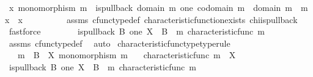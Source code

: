 \begin{isabellebody}
\ {\isachardoublequoteopen}{\isasymAnd}x{\isachardot}{\kern0pt}\ monomorphism\ m\ {\isasymlongrightarrow}\ is{\isacharunderscore}{\kern0pt}pullback\ {\isacharparenleft}{\kern0pt}domain\ m{\isacharparenright}{\kern0pt}\ one\ {\isacharparenleft}{\kern0pt}codomain\ m{\isacharparenright}{\kern0pt}\ {\isasymOmega}\ {\isacharparenleft}{\kern0pt}{\isasymbeta}\isactrlbsub domain\ m\isactrlesub {\isacharparenright}{\kern0pt}\ {\isasymt}\ m\ x\ {\isasymLongrightarrow}\ x\ {\isacharequal}{\kern0pt}\ {\isasymchi}{\isachardoublequoteclose}\isanewline
\ \ \ \ \ \ \isamarkupfalse%
\ assms\ cfunc{\isacharunderscore}{\kern0pt}type{\isacharunderscore}{\kern0pt}def\ characteristic{\isacharunderscore}{\kern0pt}function{\isacharunderscore}{\kern0pt}exists\ chi{\isacharunderscore}{\kern0pt}is{\isacharunderscore}{\kern0pt}pullback\ \isamarkupfalse%
\ fastforce\isanewline
\ \ \isamarkupfalse%
\isanewline
\ \ \isamarkupfalse%
\ \isamarkupfalse%
\ {\isachardoublequoteopen}is{\isacharunderscore}{\kern0pt}pullback\ B\ one\ X\ {\isasymOmega}\ {\isacharparenleft}{\kern0pt}{\isasymbeta}\isactrlbsub B\isactrlesub {\isacharparenright}{\kern0pt}\ {\isasymt}\ m\ {\isacharparenleft}{\kern0pt}characteristic{\isacharunderscore}{\kern0pt}func\ m{\isacharparenright}{\kern0pt}{\isachardoublequoteclose}\isanewline
\ \ \ \ \isamarkupfalse%
\ assms\ cfunc{\isacharunderscore}{\kern0pt}type{\isacharunderscore}{\kern0pt}def\ \isamarkupfalse%
\ auto\isanewline
{}\isamarkupfalse%
%
\endisatagproof
{\isafoldproof}%
%
\isadelimproof
\isanewline
%
\endisadelimproof
\isanewline
{}\isamarkupfalse%
\ characteristic{\isacharunderscore}{\kern0pt}func{\isacharunderscore}{\kern0pt}type{\isacharbrackleft}{\kern0pt}type{\isacharunderscore}{\kern0pt}rule{\isacharbrackright}{\kern0pt}{\isacharcolon}{\kern0pt}\isanewline
\ \ \ {\isachardoublequoteopen}m\ {\isacharcolon}{\kern0pt}\ B\ {\isasymrightarrow}\ X{\isachardoublequoteclose}\ {\isachardoublequoteopen}monomorphism\ m{\isachardoublequoteclose}\isanewline
\ \ \ {\isachardoublequoteopen}characteristic{\isacharunderscore}{\kern0pt}func\ m\ {\isacharcolon}{\kern0pt}\ X\ {\isasymrightarrow}\ {\isasymOmega}{\isachardoublequoteclose}\isanewline
%
\isadelimproof
%
\endisadelimproof
%
\isatagproof
{}\isamarkupfalse%
\ {\isacharminus}{\kern0pt}\isanewline
\ \ \isamarkupfalse%
\ {\isachardoublequoteopen}is{\isacharunderscore}{\kern0pt}pullback\ B\ one\ X\ {\isasymOmega}\ {\isacharparenleft}{\kern0pt}{\isasymbeta}\isactrlbsub B\isactrlesub {\isacharparenright}{\kern0pt}\ {\isasymt}\ m\ {\isacharparenleft}{\kern0pt}characteristic{\isacharunderscore}{\kern0pt}func\ m{\isacharparenright}{\kern0pt}{\isachardoublequoteclose}\isanewline

\end{isabellebody}
